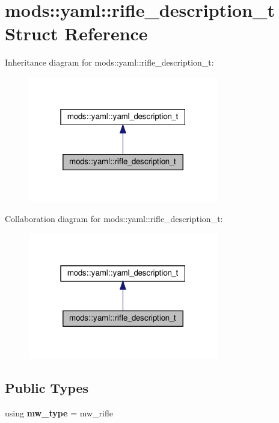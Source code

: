 \hypertarget{structmods_1_1yaml_1_1rifle__description__t}{}\section{mods\+:\+:yaml\+:\+:rifle\+\_\+description\+\_\+t Struct Reference}
\label{structmods_1_1yaml_1_1rifle__description__t}


Inheritance diagram for mods\+:\+:yaml\+:\+:rifle\+\_\+description\+\_\+t\+:
\nopagebreak
\begin{figure}[H]
\begin{center}
\leavevmode
\includegraphics[width=235pt]{structmods_1_1yaml_1_1rifle__description__t__inherit__graph}
\end{center}
\end{figure}


Collaboration diagram for mods\+:\+:yaml\+:\+:rifle\+\_\+description\+\_\+t\+:
\nopagebreak
\begin{figure}[H]
\begin{center}
\leavevmode
\includegraphics[width=235pt]{structmods_1_1yaml_1_1rifle__description__t__coll__graph}
\end{center}
\end{figure}
\subsection*{Public Types}
\begin{DoxyCompactItemize}
\item 
\mbox{\label{structmods_1_1yaml_1_1rifle__description__t_ab670fbe99b59e026078a31b444d9179c}} 
using {\bfseries mw\+\_\+type} = mw\+\_\+rifle
\end{DoxyCompactItemize}
